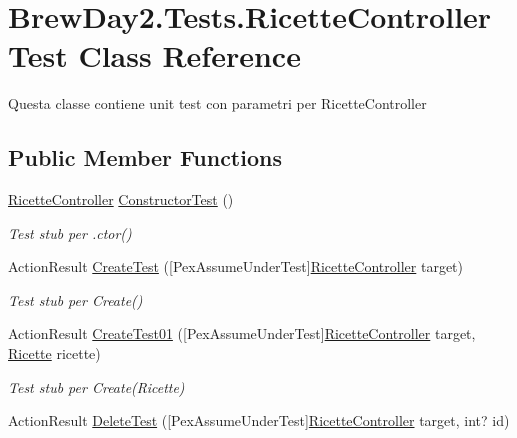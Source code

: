 \hypertarget{class_brew_day2_1_1_tests_1_1_ricette_controller_test}{}\section{Brew\+Day2.\+Tests.\+Ricette\+Controller\+Test Class Reference}
\label{class_brew_day2_1_1_tests_1_1_ricette_controller_test}


Questa classe contiene unit test con parametri per Ricette\+Controller 


\subsection*{Public Member Functions}
\begin{DoxyCompactItemize}
\item 
\mbox{\hyperlink{class_brew_day2_1_1_controllers_1_1_ricette_controller}{Ricette\+Controller}} \mbox{\hyperlink{class_brew_day2_1_1_tests_1_1_ricette_controller_test_a5dcf0005fef9f12eb8c5914cc3115273}{Constructor\+Test}} ()
\begin{DoxyCompactList}\small\item\em Test stub per .ctor()\end{DoxyCompactList}\item 
Action\+Result \mbox{\hyperlink{class_brew_day2_1_1_tests_1_1_ricette_controller_test_a30c535ac99265b5a206569fb63178500}{Create\+Test}} (\mbox{[}Pex\+Assume\+Under\+Test\mbox{]}\mbox{\hyperlink{class_brew_day2_1_1_controllers_1_1_ricette_controller}{Ricette\+Controller}} target)
\begin{DoxyCompactList}\small\item\em Test stub per Create()\end{DoxyCompactList}\item 
Action\+Result \mbox{\hyperlink{class_brew_day2_1_1_tests_1_1_ricette_controller_test_ad28ff7d3a50772dc34cc2b9a2b826a06}{Create\+Test01}} (\mbox{[}Pex\+Assume\+Under\+Test\mbox{]}\mbox{\hyperlink{class_brew_day2_1_1_controllers_1_1_ricette_controller}{Ricette\+Controller}} target, \mbox{\hyperlink{class_brew_day2_1_1_models_1_1_ricette}{Ricette}} ricette)
\begin{DoxyCompactList}\small\item\em Test stub per Create(\+Ricette)\end{DoxyCompactList}\item 
Action\+Result \mbox{\hyperlink{class_brew_day2_1_1_tests_1_1_ricette_controller_test_adde8a12157848fdf695ce1ce231a375c}{Delete\+Test}} (\mbox{[}Pex\+Assume\+Under\+Test\mbox{]}\mbox{\hyperlink{class_brew_day2_1_1_controllers_1_1_ricette_controller}{Ricette\+Controller}} target, int? id)

\end{DoxyCompactItemize}
